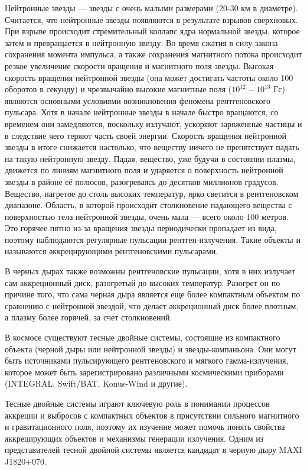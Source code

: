 	Нейтронные звезды --- звезды с очень малыми размерами (20-30 км в диаметре). Считается, что нейтронные звезды появляются в результате взрывов сверхновых. При взрыве происходит стремительный коллапс ядра нормальной звезды, которое затем и превращается в нейтронную звезду. Во время сжатия в силу закона сохранения момента импульса, а также сохранения магнитного потока происходит резкое увеличение скорости вращения и магнитного поля звезды. Высокая скорость вращения нейтронной звезды (она может достигать частоты около 100 оборотов в секунду) и чрезвычайно высокие магнитные поля ($10^{12} - 10^{13}$ Гс) являются основными условиями возникновения феномена рентгеновского пульсара. Хотя в начале нейтронные звезды в начале быстро вращаются, со временем они замедляются, поскольку излучают, ускоряют заряженные частицы и в следствие чего теряют часть своей энергии. Скорость вращения нейтронной звезды в итоге снижается настолько, что веществу ничего не препятствует падать на такую нейтронную звезду. Падая, вещество, уже будучи в состоянии плазмы, движется по линиям магнитного поля и ударяется о поверхность нейтронной звезды в районе её полюсов, разогреваясь до десятков миллионов градусов. Вещество, нагретое до столь высоких температур, ярко светится в рентгеновском диапазоне. Область, в которой происходит столкновение падающего вещества с поверхностью тела нейтронной звезды, очень мала — всего около 100 метров. Это горячее пятно из-за вращения звезды периодически пропадает из вида, поэтому наблюдаются регулярные пульсации рентген-излучения. Такие объекты и называются аккрецирующими рентгеновскими пульсарами.
	
	В черных дырах также возможны рентгеновские пульсации, хотя в них излучает сам аккреционный диск, разогретый до высоких температур. Разогрет он по причине того, что сама черная дыра является еще более компактным объектом по сравнению с нейтронной звездой, что делает аккреционный диск более плотным, а плазму более горячей, за счет столкновений.
	
	В космосе существуют тесные двойные системы, состоящие из компактного объекта (черной дыры или нейтронной звезды) и звезды-компаньона. Они могут быть источниками пульсирующего рентгеновского и мягкого гамма-излучения, которое может быть зарегистрировано различными космическими приборами (INTEGRAL, Swift/BAT, Konus-Wind и другие).
	
	Тесные двойные системы играют ключевую роль в понимании процессов аккреции и выбросов с компактных объектов в присутствии сильного магнитного и гравитационного поля, поэтому их изучение может помочь понять свойства аккрецирующих объектов и механизмы генерации излучения. Одним из представителей тесной двойной системы является кандидат в черную дыру MAXI J1820+070.
			
